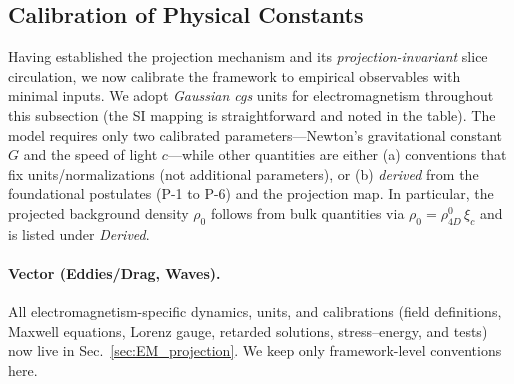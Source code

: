 \subsection{Calibration of Physical Constants}

Having established the projection mechanism and its \emph{projection-invariant} slice circulation, we now calibrate the framework to empirical observables with minimal inputs. We adopt \emph{Gaussian cgs} units for electromagnetism throughout this subsection (the SI mapping is straightforward and noted in the table). The model requires only two calibrated parameters---Newton's gravitational constant $G$ and the speed of light $c$---while other quantities are either (a) conventions that fix units/normalizations (not additional parameters), or (b) \emph{derived} from the foundational postulates (P-1 to P-6) and the projection map. In particular, the projected background density $\rho_0$ follows from bulk quantities via $\rho_0=\rho_{4D}^0\,\xi_c$ and is listed under \emph{Derived}.

\paragraph{Vector (Eddies/Drag, Waves).}
All electromagnetism-specific dynamics, units, and calibrations (field definitions, Maxwell equations, Lorenz gauge, retarded solutions, stress–energy, and tests) now live in Sec.~\ref{sec:EM_projection}. We keep only framework-level conventions here.

\medskip

